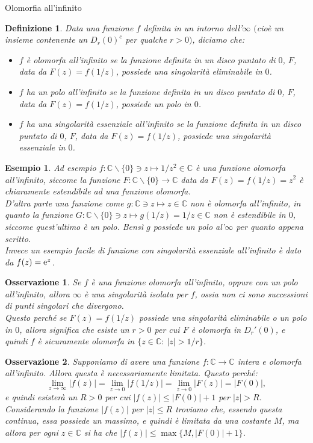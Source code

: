 \documentclass[11pt]{book}
\theoremstyle{Definizione}
\newtheorem*{mydef}{Definizione}
\theoremstyle{TeoremaProposizioneLemmaCorollarioCongettura}
\theoremstyle{OsservazioneNotaEsempio}
\newtheorem{myobs}{Osservazione}[section]
\newtheorem{myes}{Esempio}[section]
\newcommand{\C}{\mathbb{C}}
\newcommand{\Disc}[3][]{D^{#1}_{{#2}}({#3})}
\newcommand{\DiscPunt}[2]{D_{#1}'({#2})}
\newcommand{\tolto}{\smallsetminus}
\newcommand{\e}{\textup{e}}
\begin{document}
\begin{boxdef}{Olomorfia all'infinito}
\begin{mydef}
Data una funzione $f$ definita in un intorno dell'$\infty$ $($cioè un insieme contenente un $\Disc{r}{0}^c$ per qualche $r>0)$, diciamo che:
\begin{itemize}
\item $f$ è olomorfa all'infinito se la funzione definita in un disco puntato di $0$, $F$, data da $F(z) = f(1/z)$, possiede una singolarità eliminabile in $0$.
\item $f$ ha un polo all'infinito se la funzione definita in un disco puntato di $0$, $F$, data da $F(z) = f(1/z)$, possiede un polo in $0$.
\item $f$ ha una singolarità essenziale all'infinito se la funzione definita in un disco puntato di $0$, $F$, data da $F(z) = f(1/z)$, possiede una singolarità essenziale in $0$.
\end{itemize}
\end{mydef}
\end{boxdef}
\begin{myes}
Ad esempio $f:\C \tolto \{0\} \ni z \longmapsto 1/z^2\in \C$ è una funzione olomorfa all'infinito, siccome la funzione $F:\C \tolto \{0\} \longrightarrow \C$ data da $F(z) = f(1/z) = z^2$ è chiaramente estendibile ad una funzione olomorfa.\\
D'altra parte una funzione come $g:\C \ni z \longmapsto z\in \C$ non è olomorfa all'infinito, in quanto la funzione $G:\C\tolto \{0\} \ni z \longmapsto g(1/z) = 1/z\in \C$ non è estendibile in $0$, siccome quest'ultimo è un polo. Bensì $g$ possiede un polo al'$\infty$ per quanto appena scritto.\\
Invece un esempio facile di funzione con singolarità essenziale all'infinito è dato da $f(z) = \e^{z}$.
\end{myes}
\begin{myobs}
Se $f$ è una funzione olomorfa all'infinito, oppure con un polo all'infinito, allora $\infty$ è una singolarità isolata per $f$, ossia non ci sono successioni di punti singolari che divergono.\\
Questo perché se $F(z) = f(1/z)$ possiede una singolarità eliminabile o un polo in $0$, allora significa che esiste un $r > 0$ per cui $F$ è olomorfa in $\DiscPunt{r}{0}$, e quindi $f$ è sicuramente olomorfa in $\{z\in \C:\ |z| > 1/r\}$.
\end{myobs}
\begin{myobs}
Supponiamo di avere una funzione $f:\C \longrightarrow \C$ intera e olomorfa all'infinito. Allora questa è necessariamente limitata. Questo perché:
$$
\lim_{z \to \infty} |f(z)| = \lim_{ z \to 0} |f(1/z)| = \lim_{z \to 0} |F(z)| = |F(0)|,
$$
e quindi esisterà un $R > 0$ per cui $|f(z)| \leq |F(0)|+1$ per $|z| > R$. Considerando la funzione $|f(z)|$ per $|z| \leq R$ troviamo che, essendo questa continua, essa possiede un massimo, e quindi è limitata da una costante $M$, ma allora per ogni $z\in \C$ si ha che $|f(z)| \leq \max\{M,|F(0)|+1\}$.
\end{myobs}
\end{document}
